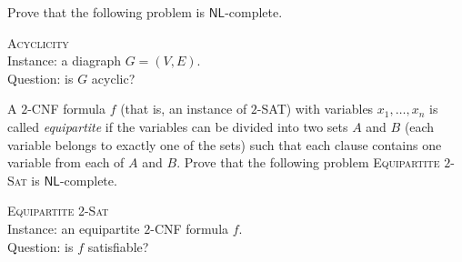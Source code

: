 \documentclass[a4paper, answers]{exam}
\begin{document}
\begin{questions}
	\question
	Prove that the following problem is $\mathsf{NL}$-complete.
	
	\textsc{Acyclicity} \\
	Instance: a diagraph $G = (V,E)$. \\
	Question: is $G$ acyclic?

	\question
	A $2$-CNF formula $f$ (that is, an instance of $2$-SAT) with variables
	$x_1, \ldots, x_n$ is called \emph{equipartite} if the variables can be
	divided into two sets $A$ and $B$ (each variable belongs to exactly one of
	the sets) such that each clause contains one variable from each of $A$ and
	$B$.
	Prove that the following problem \textsc{Equipartite $2$-Sat} is
	$\mathsf{NL}$-complete.

	\textsc{Equipartite 2-Sat} \\
	Instance: an equipartite $2$-CNF formula $f$. \\
	Question: is $f$ satisfiable?
\end{questions}
\end{document}
